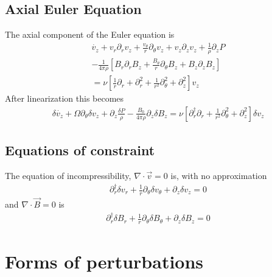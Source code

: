 \documentclass[letterpaper]{article}
\begin{document}
\subsection{Axial Euler Equation}
The axial component of the Euler equation is
\begin{align}
\dot{v_z} + v_r \partial_r v_z + \frac{v_\theta}{r}\partial_\theta v_z + v_z \partial_z v_z + \frac{1}{\rho}\partial_z P
\\ \nonumber
-\frac{1}{4\pi\rho}\left[B_r\partial_r B_z + \frac{B_\theta}{r}\partial_\theta B_z + B_z \partial_z B_z \right]
\\ \nonumber
=\nu\left[\frac{1}{r}\partial_r + \partial_r^2 + \frac{1}{r^2}\partial_\theta^2 + \partial_z^2\right]v_z
\end{align}
After linearization this becomes
\begin{align}
\delta\dot{v_z} + \Omega \partial_\theta \delta v_z + \partial_z \frac{\delta P}{\rho} -\frac{B_0}{4\pi\rho} \partial_z \delta B_z = \nu\left[\partial_r^\dagger \partial_r + \frac{1}{r^2}\partial_\theta^2 + \partial_z^2\right]\delta v_z
\end{align}

\subsection{Equations of constraint}

The equation of incompressibility, $\nabla\cdot\vec{v}=0$ is, with no approximation
\begin{align}
\partial_r^\dagger \delta v_r + \frac{1}{r}\partial_\theta \delta v_\theta + \partial_z \delta v_z = 0
\end{align}
and $\nabla\cdot\vec{B}=0$ is
\begin{align}
\partial_r^\dagger \delta B_r + \frac{1}{r}\partial_\theta \delta B_\theta + \partial_z \delta B_z = 0
\end{align}

\section{Forms of perturbations}
\end{document}
